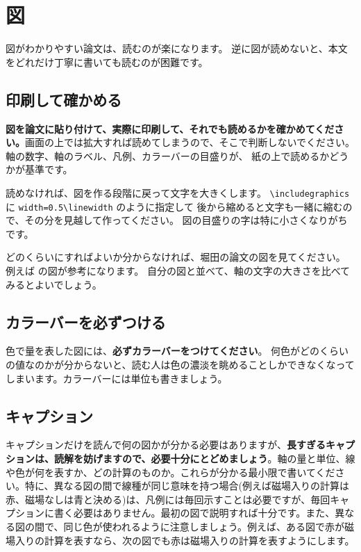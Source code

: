 \section{図}
\label{sec:guide_figure}

図がわかりやすい論文は、読むのが楽になります。
逆に図が読めないと、本文をどれだけ丁寧に書いても読むのが困難です。

\subsection{印刷して確かめる}

\textbf{図を論文に貼り付けて、実際に印刷して、それでも読めるかを確かめてください。}画面の上では拡大すれば読めてしまうので、そこで判断しないでください。軸の数字、軸のラベル、凡例、カラーバーの目盛りが、
紙の上で読めるかどうかが基準です。

読めなければ、図を作る段階に戻って文字を大きくします。
\verb|\includegraphics| に \verb|width=0.5\linewidth| のように指定して
後から縮めると文字も一緒に縮むので、その分を見越して作ってください。
図の目盛りの字は特に小さくなりがちです。

どのくらいにすればよいか分からなければ、堀田の論文の図を見てください。
例えば \citet{hotta2022} の図が参考になります。
自分の図と並べて、軸の文字の大きさを比べてみるとよいでしょう。

\subsection{カラーバーを必ずつける}

色で量を表した図には、\textbf{必ずカラーバーをつけてください}。
何色がどのくらいの値なのかが分からないと、読む人は色の濃淡を眺めることしかできなくなってしまいます。カラーバーには単位も書きましょう。

\subsection{キャプション}

キャプションだけを読んで何の図かが分かる必要はありますが、\textbf{長すぎるキャプションは、読解を妨げますので、必要十分にとどめましょう}。軸の量と単位、線や色が何を表すか、どの計算のものか。これらが分かる最小限で書いてください。特に、異なる図の間で線種が同じ意味を持つ場合(例えば磁場入りの計算は赤、磁場なしは青と決める)は、凡例には毎回示すことは必要ですが、毎回キャプションに書く必要はありません。最初の図で説明すれば十分です。また、異なる図の間で、同じ色が使われるように注意しましょう。例えば、ある図で赤が磁場入りの計算を表すなら、次の図でも赤は磁場入りの計算を表すようにします。

